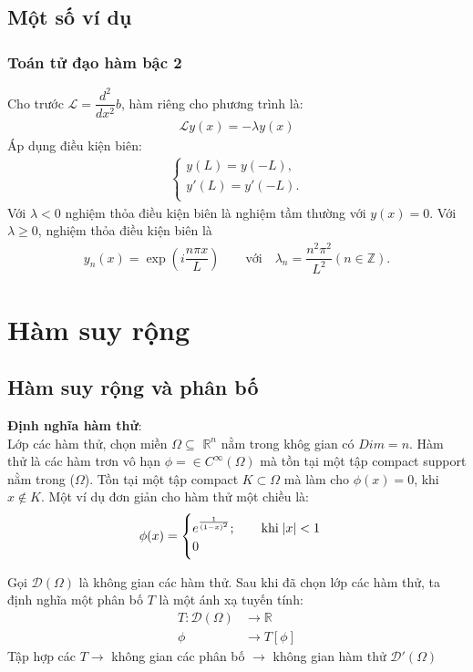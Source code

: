 \documentclass{report}
\newcommand{\f}[2]{\dfrac{#1}{#2}}
\begin{document}
\section{Một số ví dụ}
\subsection*{Toán tử đạo hàm bậc 2}
Cho trước $\mathcal{L} = \f{d^2}{dx^2}b$, hàm riêng cho phương trình là:
\begin{align*}
	\mathcal{L} y(x) = -\lambda y(x)
\end{align*}
Áp dụng điều kiện biên:
\begin{align*}
	\begin{cases}
		y(L) = y(-L), \\
		y'(L) = y'(-L). \\
	\end{cases}
\end{align*}
Với $\lambda < 0$ nghiệm thỏa điều kiện biên là nghiệm tầm thường với $y(x) = 0$. Với $\lambda \geq 0$, nghiệm thỏa điều kiện biên là
\begin{align*}
	y_n(x) = \exp(i \f{n\pi x}{L}) \quad \quad \text{với}\quad \lambda_n = \f{n^2 \pi^2}{L^2} (n\in \mathbb{Z}).
\end{align*}



\chapter{Hàm suy rộng}
\section{Hàm suy rộng và phân bố}
\textbf{Định nghĩa hàm thử}:\\
Lớp các hàm thử, chọn miền $\Omega \subseteq$ $\mathbb{R}^n$ nằm trong khôg gian có $Dim = n$. Hàm thử là các hàm trơn vô hạn $\phi = \in C^{\infty}(\Omega)$ mà tồn tại một tập compact support nằm trong ($\Omega$). Tồn tại một tập compact $K \subset \Omega$ mà làm cho $\phi(x) = 0$, khi $x \notin K$. Một ví dụ đơn giản cho hàm thử một chiều là:
\begin{align*}
	\phi(x) =
	\begin{cases}
		e^{\frac{1}{(1-x)^2}}; \quad \quad \text{khi} \; \abs{x}<1 \\
		0
	\end{cases}
\end{align*}

Gọi $\mathcal{D}(\Omega)$ là không gian các hàm thử. Sau khi đã chọn lớp các hàm thử, ta định nghĩa một phân bố $T$ là một ánh xạ tuyến tính:
\begin{align*}
	T:  \mathcal{D}(\Omega) & \rightarrow \mathbb{R} \\
	\phi                    & \rightarrow T[\phi]
\end{align*}
Tập hợp các $T\rightarrow$ không gian các phân bố $\rightarrow$ không gian hàm thử $\mathcal{D}'(\Omega)$
\end{document}
